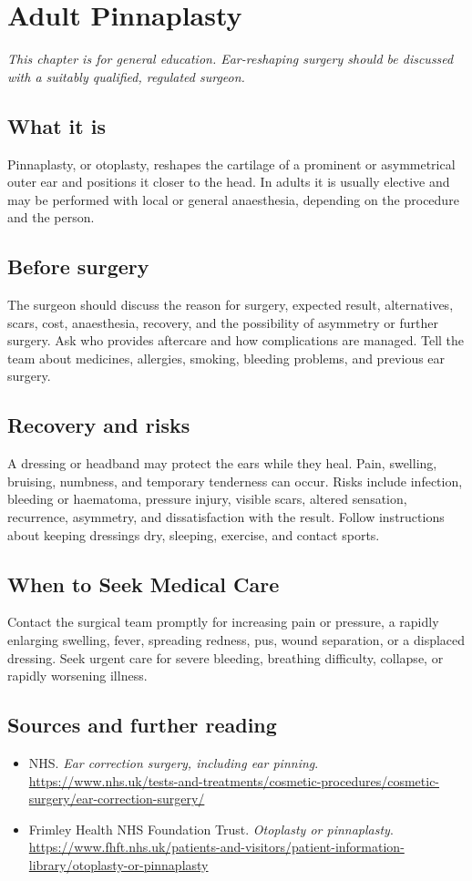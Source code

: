\chapter{Adult Pinnaplasty}

\medskip
\noindent\textit{This chapter is for general education. Ear-reshaping surgery should be discussed with a suitably qualified, regulated surgeon.}

\section*{What it is}
Pinnaplasty, or otoplasty, reshapes the cartilage of a prominent or asymmetrical outer ear and positions it closer to the head. In adults it is usually elective and may be performed with local or general anaesthesia, depending on the procedure and the person.

\section*{Before surgery}
The surgeon should discuss the reason for surgery, expected result, alternatives, scars, cost, anaesthesia, recovery, and the possibility of asymmetry or further surgery. Ask who provides aftercare and how complications are managed. Tell the team about medicines, allergies, smoking, bleeding problems, and previous ear surgery.

\section*{Recovery and risks}
A dressing or headband may protect the ears while they heal. Pain, swelling, bruising, numbness, and temporary tenderness can occur. Risks include infection, bleeding or haematoma, pressure injury, visible scars, altered sensation, recurrence, asymmetry, and dissatisfaction with the result. Follow instructions about keeping dressings dry, sleeping, exercise, and contact sports.

\section*{When to Seek Medical Care}
Contact the surgical team promptly for increasing pain or pressure, a rapidly enlarging swelling, fever, spreading redness, pus, wound separation, or a displaced dressing. Seek urgent care for severe bleeding, breathing difficulty, collapse, or rapidly worsening illness.

\section*{Sources and further reading}
\begin{itemize}
\item NHS. \textit{Ear correction surgery, including ear pinning}. \url{https://www.nhs.uk/tests-and-treatments/cosmetic-procedures/cosmetic-surgery/ear-correction-surgery/}
\item Frimley Health NHS Foundation Trust. \textit{Otoplasty or pinnaplasty}. \url{https://www.fhft.nhs.uk/patients-and-visitors/patient-information-library/otoplasty-or-pinnaplasty}
\end{itemize}
